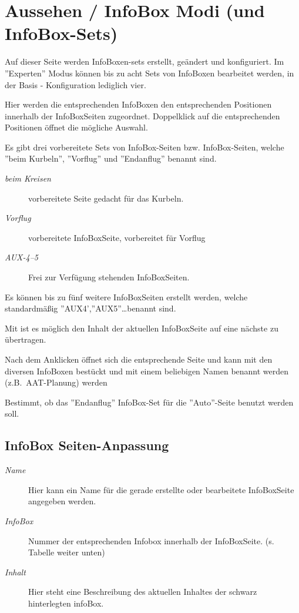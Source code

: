 \section{Aussehen / InfoBox Modi (und InfoBox-Sets)}\label{sec:infobox_sets}

Auf dieser Seite werden InfoBoxen-sets erstellt, geändert und konfiguriert.
Im ''Experten'' Modus können bis zu acht Sets von InfoBoxen bearbeitet werden,
in der Basis - Konfiguration lediglich vier.

Hier werden die entsprechenden InfoBoxen den entsprechenden Positionen innerhalb
der InfoBoxSeiten zugeordnet. Doppelklick auf die entsprechenden Positionen öffnet die mögliche Auswahl.

Es gibt drei vorbereitete Sets von InfoBox-Seiten
bzw. InfoBox-Seiten, welche ''beim Kurbeln'', ''Vorflug'' und ''Endanflug'' benannt sind.

\begin{description}
\item[\textit{beim Kreisen}]  vorbereitete Seite gedacht für das Kurbeln.\\
\item[\textit{Vorflug}] vorbereitete InfoBoxSeite, vorbereitet für Vorflug\\
\item[\textit{AUX-4--5}]Frei zur Verfügung stehenden InfoBoxSeiten.
\end{description}

Es können bis zu fünf weitere InfoBoxSeiten erstellt werden, welche
standardmäßig ''AUX4',''AUX5''\dots benannt sind.

Mit  ist es möglich den Inhalt der aktuellen InfoBoxSeite auf eine nächste zu übertragen.

Nach dem Anklicken öffnet sich die entsprechende Seite und kann mit den diversen InfoBoxen bestückt
und mit einem beliebigen Namen benannt werden (z.B.\ AAT-Planung) werden

  Bestimmt, ob das ''Endanflug'' InfoBox-Set für die
 ''Auto''-Seite benutzt werden soll.
%
\subsection*{InfoBox Seiten-Anpassung}
%
\begin{description}
\item[\textit{Name}]  Hier kann ein Name für die gerade erstellte oder bearbeitete InfoBoxSeite angegeben werden.
\item[\textit{InfoBox}]  Nummer der entsprechenden Infobox innerhalb der InfoBoxSeite. (s. Tabelle weiter unten)
\item[\textit{Inhalt}]  Hier steht eine Beschreibung des aktuellen Inhaltes der schwarz hinterlegten infoBox.
\end{description}



